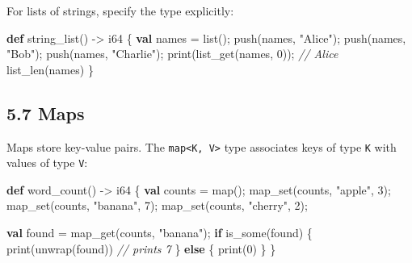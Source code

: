 \documentclass[
  english,
]{book}
\newenvironment{Shaded}{\begin{snugshade}}{\end{snugshade}}
\newcommand{\CommentTok}[1]{\textcolor[rgb]{0.42,0.60,0.33}{\textit{#1}}}
\newcommand{\ControlFlowTok}[1]{\textcolor[rgb]{0.77,0.53,0.75}{\textbf{#1}}}
\newcommand{\DataTypeTok}[1]{\textcolor[rgb]{0.31,0.79,0.69}{#1}}
\newcommand{\DecValTok}[1]{\textcolor[rgb]{0.71,0.81,0.66}{#1}}
\newcommand{\FunctionTok}[1]{\textcolor[rgb]{0.86,0.86,0.67}{#1}}
\newcommand{\KeywordTok}[1]{\textcolor[rgb]{0.34,0.61,0.84}{\textbf{#1}}}
\newcommand{\NormalTok}[1]{\textcolor[rgb]{0.83,0.83,0.83}{#1}}
\newcommand{\OperatorTok}[1]{\textcolor[rgb]{0.83,0.83,0.83}{#1}}
\newcommand{\StringTok}[1]{\textcolor[rgb]{0.81,0.57,0.47}{#1}}
\begin{document}
For lists of strings, specify the type explicitly:

\begin{Shaded}
\begin{Highlighting}[]
\KeywordTok{def}\NormalTok{ string\_list() }\OperatorTok{{-}\textgreater{}} \DataTypeTok{i64}\NormalTok{ \{}
    \KeywordTok{val}\NormalTok{ names }\OperatorTok{=} \DataTypeTok{list}\NormalTok{();}
    \FunctionTok{push}\NormalTok{(names, }\StringTok{"Alice"}\NormalTok{);}
    \FunctionTok{push}\NormalTok{(names, }\StringTok{"Bob"}\NormalTok{);}
    \FunctionTok{push}\NormalTok{(names, }\StringTok{"Charlie"}\NormalTok{);}
    \FunctionTok{print}\NormalTok{(}\FunctionTok{list\_get}\NormalTok{(names, }\DecValTok{0}\NormalTok{));   }\CommentTok{// Alice}
    \FunctionTok{list\_len}\NormalTok{(names)}
\NormalTok{\}}
\end{Highlighting}
\end{Shaded}

\subsection{5.7 Maps}\label{maps}

Maps store key-value pairs. The
\texttt{map\textless{}K,\ V\textgreater{}} type associates keys of type
\texttt{K} with values of type \texttt{V}:

\begin{Shaded}
\begin{Highlighting}[]
\KeywordTok{def}\NormalTok{ word\_count() }\OperatorTok{{-}\textgreater{}} \DataTypeTok{i64}\NormalTok{ \{}
    \KeywordTok{val}\NormalTok{ counts }\OperatorTok{=} \DataTypeTok{map}\NormalTok{();}
    \FunctionTok{map\_set}\NormalTok{(counts, }\StringTok{"apple"}\NormalTok{, }\DecValTok{3}\NormalTok{);}
    \FunctionTok{map\_set}\NormalTok{(counts, }\StringTok{"banana"}\NormalTok{, }\DecValTok{7}\NormalTok{);}
    \FunctionTok{map\_set}\NormalTok{(counts, }\StringTok{"cherry"}\NormalTok{, }\DecValTok{2}\NormalTok{);}

    \KeywordTok{val}\NormalTok{ found }\OperatorTok{=} \FunctionTok{map\_get}\NormalTok{(counts, }\StringTok{"banana"}\NormalTok{);}
    \ControlFlowTok{if} \FunctionTok{is\_some}\NormalTok{(found) \{}
        \FunctionTok{print}\NormalTok{(unwrap(found))   }\CommentTok{// prints 7}
\NormalTok{    \} }\ControlFlowTok{else}\NormalTok{ \{}
        \FunctionTok{print}\NormalTok{(}\DecValTok{0}\NormalTok{)}
\NormalTok{    \}}
\NormalTok{\}}
\end{Highlighting}
\end{Shaded}
\end{document}

